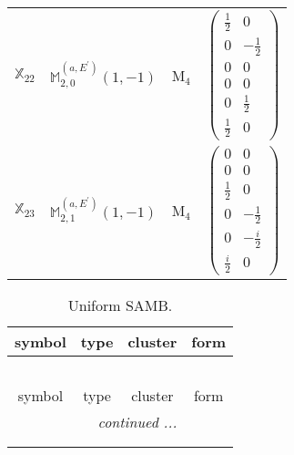 \documentclass[fleqn,10pt,landscape]{article}
\begin{document}
\begin{itemize}
\begin{center}
\begin{longtable}{c|c|c|c}
$ \mathbb{X}_{22} $ & $\mathbb{M}_{2,0}^{(a,E^{\prime})}(1,-1)$ & M$_{4}$ & $\begin{pmatrix} \frac{1}{2} & 0 \\ 0 & - \frac{1}{2} \\ 0 & 0 \\ 0 & 0 \\ 0 & \frac{1}{2} \\ \frac{1}{2} & 0 \end{pmatrix}$ \\
$ \mathbb{X}_{23} $ & $\mathbb{M}_{2,1}^{(a,E^{\prime})}(1,-1)$ & M$_{4}$ & $\begin{pmatrix} 0 & 0 \\ 0 & 0 \\ \frac{1}{2} & 0 \\ 0 & - \frac{1}{2} \\ 0 & - \frac{i}{2} \\ \frac{i}{2} & 0 \end{pmatrix}$ \\
\end{longtable}
\end{center}
\begin{center}
\renewcommand{\arraystretch}{1.3}
\begin{longtable}{c|c|c|c}
\caption{Uniform SAMB.}
 \\
 \hline \hline
symbol & type & cluster & form \\ \hline \endfirsthead

\multicolumn{3}{l}{\tablename\ \thetable{}} \\
 \hline \hline
symbol & type & cluster & form \\ \hline \endhead

 \hline \hline
\multicolumn{3}{r}{\footnotesize\it continued ...} \\ \endfoot

 \hline \hline
\multicolumn{3}{r}{} \\ \endlastfoot


\end{longtable}
\end{center}
\end{itemize}
\end{document}
